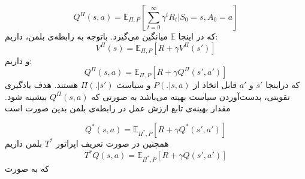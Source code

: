  \begin{equation}
	Q^{\Pi}(s,a) = \mathbb{E}_{\Pi,P}[\sum_{t=0}^{\infty}\gamma^tR_t|S_0=s,A_0=a]
\end{equation}
  که در اینجا 
  $\mathbb{E}$
  میانگین می‌گیرد.
  باتوجه به رابطه‌ی بلمن، داریم:
 \begin{equation}
	V^{\Pi}(s) = \mathbb{E}_{\Pi,P}[R+\gamma V^{\Pi}(s')]
\end{equation}  
  و داریم:
   \begin{equation}
  	Q^{\Pi}(s,a) = \mathbb{E}_{\Pi,P}[R+\gamma Q^{\Pi}(s',a')]
  \end{equation}  
که دراینجا $s'$
و $a'$
قابل اتخاذ از 
$P(.|s,a)$
و سیاست
$\Pi(.|s')$
هستند.
هدف یادگیری تقویتی، بدست‌آوردن سیاست بهیته می‌باشد به صورتی که 
$Q^{\Pi}(s,a)$
بیشینه شود.
مقدار بهینه‌ی تابع ارزش عمل در رابطه‌ی بلمن بدین صورت است

\begin{equation}
	Q^{*}(s,a) = \mathbb{E}_{\Pi^*,P}[R+\gamma Q^{*}(s',a')]
\end{equation} 
همچنین در صورت تعریف اپراتور $T^*$ بلمن داریم
\begin{equation}
	T^{*}Q(s,a) = \mathbb{E}_{\Pi^*,P}[R+\gamma Q(s',a')]
\end{equation} 
که به صورت 